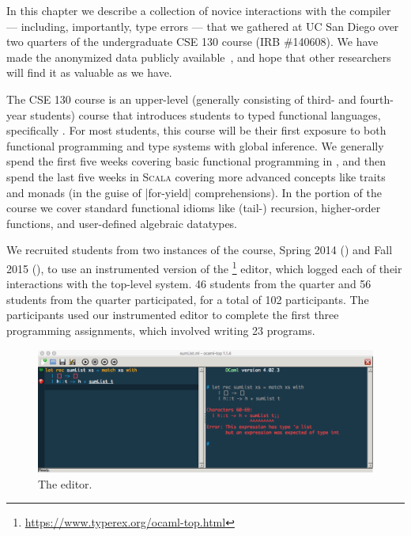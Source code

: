 In this chapter we describe a collection of novice interactions with the
\ocaml compiler --- including, importantly, type errors --- that we
gathered at UC San Diego over two quarters of the undergraduate CSE 130
course (IRB \#140608).
%
We have made the anonymized data publicly
available~\citep{Seidel2017-ko}, and hope that other researchers will
find it as valuable as we have.

The CSE 130 course is an upper-level (\ie generally consisting of third-
and fourth-year students) course that introduces students to typed
functional languages, specifically \ocaml.
%
For most students, this course will be their first exposure to both
functional programming and type systems with global inference.
%
We generally spend the first five weeks covering basic functional
programming in \ocaml, and then spend the last five weeks in
\textsc{Scala} covering more advanced concepts like traits and
monads (in the guise of |for-yield| comprehensions).
%
In the \ocaml portion of the course we cover standard functional idioms
like (tail-) recursion, higher-order functions, and user-defined
algebraic datatypes.

We recruited students from two instances of the course, Spring 2014
(\SPRING) and Fall 2015 (\FALL), to use an instrumented version of the
\ocamltop\footnote{\url{https://www.typerex.org/ocaml-top.html}} editor, which logged each of their
interactions with the \ocaml top-level system.
%
46 students from the \SPRING quarter and 56 students from the \FALL
quarter participated, for a total of 102 participants.
%
The participants used our instrumented editor to complete the first
three programming assignments, which involved writing 23 \ocaml
programs.
%

\begin{figure}
\centering
\includegraphics[width=\linewidth]{ocaml-top.png}
\caption{The \ocamltop editor.}
\label{fig:intro:ocaml-top}
\end{figure}

